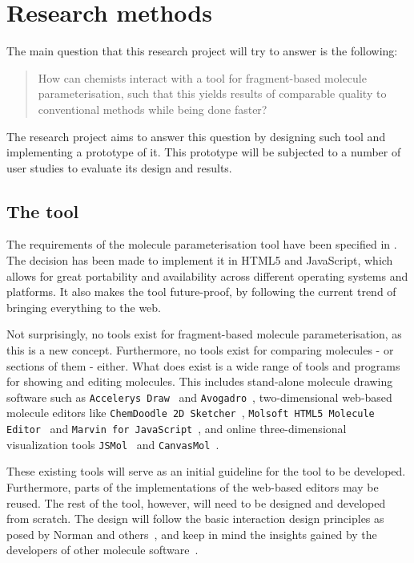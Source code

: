 \chapter{Research methods}

The main question that this research project will try to answer is the following:
\begin{quote}
How can chemists interact with a tool for fragment-based molecule parameterisation, such that this yields results of comparable quality to conventional methods while being done faster?
\end{quote}
The research project aims to answer this question by designing such tool and implementing a prototype of it. This prototype will be subjected to a number of user studies to evaluate its design and results.


\section{The tool}

The requirements of the molecule parameterisation tool have been specified in . The decision has been made to implement it in HTML5 and JavaScript, which allows for great portability and availability across different operating systems and platforms. It also makes the tool future-proof, by following the current trend of bringing everything to the web.

Not surprisingly, no tools exist for fragment-based molecule parameterisation, as this is a new concept. Furthermore, no tools exist for comparing molecules - or sections of them - either. What does exist is a wide range of tools and programs for showing and editing molecules. This includes stand-alone molecule drawing software such as \verb|Accelerys Draw|~\cite{accelrys2012accelrys} and \verb|Avogadro|~\cite{hanwell2012avogadro}, two-dimensional web-based molecule editors like \verb|ChemDoodle 2D Sketcher|~\cite{ichemlabs2013chemdoodle}, \verb|Molsoft HTML5 Molecule Editor|~\cite{molsoft2012molsoft} and \verb|Marvin for JavaScript|~\cite{chemxon2013marvin}, and online three-dimensional visualization tools \verb|JSMol|~\cite{hanson2013jsmol} and \verb|CanvasMol|~\cite{altered2013canvasmol}.

These existing tools will serve as an initial guideline for the tool to be developed. Furthermore, parts of the implementations of the web-based editors may be reused. The rest of the tool, however, will need to be designed and developed from scratch. The design will follow the basic interaction design principles as posed by Norman and others~\cite{norman2002design, norman1990interfaces, norman2002emotion, norman2005human, norman2010gestural, thimbleby2007press, blair2008user, badre2002shaping}, and keep in mind the insights gained by the developers of other molecule software~\cite{ertl2010molecular, hanson2013jsmol, bienfait2013jsme, ekins2013tb}.



